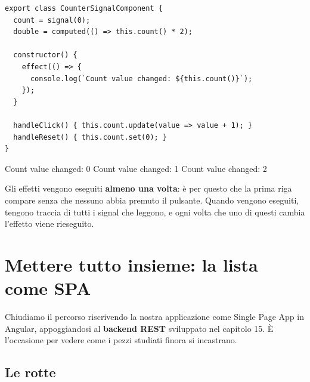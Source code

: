 \begin{affianco}[0.56][c]
\codicepiccolo
\begin{lstlisting}[style=ts, name=counter-signal.component.ts]
export class CounterSignalComponent {
  count = signal(0);
  double = computed(() => this.count() * 2);

  constructor() {
    effect(() => {
      console.log(`Count value changed: ${this.count()}`);
    });
  }

  handleClick() { this.count.update(value => value + 1); }
  handleReset() { this.count.set(0); }
}
\end{lstlisting}
\risultato
\begin{immagine}
\end{immagine}
\begin{console}
Count value changed: 0
Count value changed: 1
Count value changed: 2
\end{console}
\end{affianco}

Gli effetti vengono eseguiti \textbf{almeno una volta}: è per questo che la
prima riga compare senza che nessuno abbia premuto il pulsante. Quando vengono
eseguiti, tengono traccia di tutti i signal che leggono, e ogni volta che uno di
questi cambia l'effetto viene rieseguito.

\section{Mettere tutto insieme: la lista come SPA}

Chiudiamo il percorso riscrivendo la nostra applicazione come Single Page App in
Angular, appoggiandosi al \textbf{backend REST} sviluppato nel capitolo 15. È
l'occasione per vedere come i pezzi studiati finora si incastrano.

\subsection{Le rotte}

